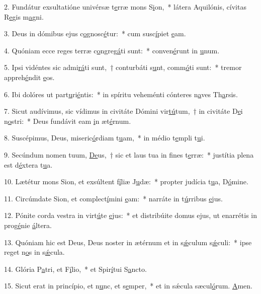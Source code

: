 2. Fundátur exsultatióne univérsæ t\uline{e}rræ mons S\uline{i}on,~* látera Aquilónis, cívitas R\uline{e}gis m\uline{a}gni.\par 
3. Deus in dómibus ejus c\uline{o}gnosc\uline{é}tur:~* cum susc\uline{í}piet \uline{e}am.\par 
4. Quóniam ecce reges terræ c\uline{o}ngreg\uline{á}ti sunt:~* conven\uline{é}runt in \uline{u}num.\par 
5. Ipsi vidéntes sic admi\uline{rá}ti sunt,~† conturbáti s\uline{u}nt, comm\uline{ó}ti sunt:~* tremor appreh\uline{é}ndit \uline{e}os.\par 
6. Ibi dolóres ut part\uline{u}ri\uline{é}ntis:~* in spíritu veheménti cónteres n\uline{a}ves Th\uline{a}rsis.\par 
7. Sicut audívimus, sic vídimus in civitáte Dómini vir\uline{tú}tum,~† in civitáte D\uline{e}i n\uline{o}stri:~* Deus fundávit eam \uline{i}n æt\uline{é}rnum.\par 
8. Suscépimus, Deus, miseric\uline{ó}rdiam t\uline{u}am,~* in médio t\uline{e}mpli t\uline{u}i.\par 
9. Secúndum nomen tuum, \uline{De}us,~† sic et laus tua in f\uline{i}nes t\uline{e}rræ:~* justítia plena est d\uline{é}xtera t\uline{u}a.\par 
10. Lætétur mons Sion, et exsúltent f\uline{í}liæ J\uline{u}dæ:~* propter judícia t\uline{u}a, D\uline{ó}mine.\par 
11. Circúmdate Sion, et complect\uline{í}mini \uline{e}am:~* narráte in t\uline{ú}rribus \uline{e}jus.\par 
12. Pónite corda vestra in virt\uline{ú}te \uline{e}jus:~* et distribúite domus ejus, ut enarrétis in prog\uline{é}nie \uline{á}ltera.\par 
13. Quóniam hic est Deus, Deus noster in ætérnum et in s\uline{ǽ}culum s\uline{ǽ}culi:~* ipse reget n\uline{o}s in s\uline{ǽ}cula.\par 
14. Glória P\uline{a}tri, et F\uline{í}lio,~* et Spir\uline{í}tui S\uline{a}ncto.\par 
15. Sicut erat in princípio, et n\uline{u}nc, et s\uline{e}mper,~* et in sǽcula sæcul\uline{ó}rum. \uline{A}men.\par 
